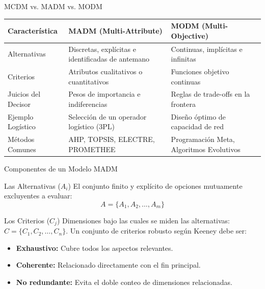 \documentclass[aspectratio=169, 10pt]{beamer}
\begin{document}
\begin{frame}{MCDM vs. MADM vs. MODM}
    \begin{table}
        \centering
        \scriptsize
        \begin{tabular}{lll}
            \toprule
            \textbf{Característica} & \textbf{MADM (Multi-Attribute)} & \textbf{MODM (Multi-Objective)} \\
            \midrule
            Alternativas & Discretas, explícitas e identificadas de antemano & Continuas, implícitas e infinitas \\
            Criterios & Atributos cualitativos o cuantitativos & Funciones objetivo continuas \\
            Juicios del Decisor & Pesos de importancia e indiferencias & Reglas de trade-offs en la frontera \\
            Ejemplo Logístico & Selección de un operador logístico (3PL) & Diseño óptimo de capacidad de red \\
            Métodos Comunes & AHP, TOPSIS, ELECTRE, PROMETHEE & Programación Meta, Algoritmos Evolutivos \\
            \bottomrule
        \end{tabular}
    \end{table}
\end{frame}

\begin{frame}{Componentes de un Modelo MADM}
    \begin{block}{Las Alternativas ($A_i$)}
        El conjunto finito y explícito de opciones mutuamente excluyentes a evaluar:
        \begin{equation*}
            A = \{A_1, A_2, \dots, A_m\}
        \end{equation*}
    \end{block}
    \begin{block}{Los Criterios ($C_j$)}
        Dimensiones bajo las cuales se miden las alternativas: $C = \{C_1, C_2, \dots, C_n\}$. Un conjunto de criterios robusto según Keeney debe ser:
        \begin{itemize}
            \item \textbf{Exhaustivo:} Cubre todos los aspectos relevantes.
            \item \textbf{Coherente:} Relacionado directamente con el fin principal.
            \item \textbf{No redundante:} Evita el doble conteo de dimensiones relacionadas.
        \end{itemize}
    \end{block}
\end{frame}
\end{document}
